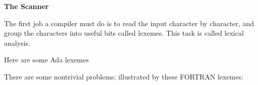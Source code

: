 %
%
\begin{slide}{}
{\bf The Scanner}

The first job a compiler must do is to read the input
character by character, and group the characters into
useful bits called lexemes.  This task is called
lexical analysis.

Here are some Ada lexemes





\vspace{3ex}

There are some nontrivial problems; illustrated by these
FORTRAN lexemes:





\vspace{3ex}
\end{slide}

